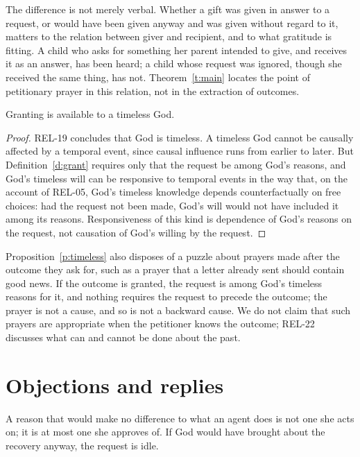 \documentclass{situationist-preprint}
\begin{document}
The difference is not merely verbal. Whether a gift was given in answer to a request, or would have been given anyway and was given without regard to it, matters to the relation between giver and recipient, and to what gratitude is fitting. A child who asks for something her parent intended to give, and receives it as an answer, has been heard; a child whose request was ignored, though she received the same thing, has not. Theorem~\ref{t:main} locates the point of petitionary prayer in this relation, not in the extraction of outcomes.

\begin{proposition}[Timelessness]\label{p:timeless}
Granting is available to a timeless God.
\end{proposition}

\begin{proof}
REL-19 concludes that God is timeless. A timeless God cannot be causally affected by a temporal event, since causal influence runs from earlier to later. But Definition~\ref{d:grant} requires only that the request be among God's reasons, and God's timeless will can be responsive to temporal events in the way that, on the account of REL-05, God's timeless knowledge depends counterfactually on free choices: had the request not been made, God's will would not have included it among its reasons. Responsiveness of this kind is dependence of God's reasons on the request, not causation of God's willing by the request.
\end{proof}

Proposition~\ref{p:timeless} also disposes of a puzzle about prayers made after the outcome they ask for, such as a prayer that a letter already sent should contain good news. If the outcome is granted, the request is among God's timeless reasons for it, and nothing requires the request to precede the outcome; the prayer is not a cause, and so is not a backward cause. We do not claim that such prayers are appropriate when the petitioner knows the outcome; REL-22 discusses what can and cannot be done about the past.

\section{Objections and replies}

\begin{objection}
A reason that would make no difference to what an agent does is not one she acts on; it is at most one she approves of. If God would have brought about the recovery anyway, the request is idle.
\end{objection}
\end{document}
